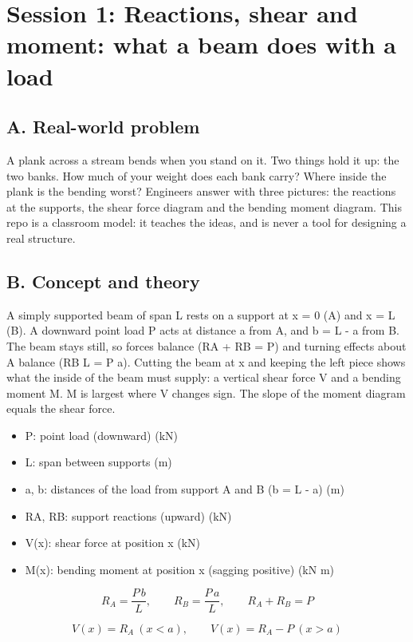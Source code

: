 \documentclass[11pt,a4paper]{article}
\begin{document}
\section{Session 1: Reactions, shear and moment: what a beam does with a load}

\subsection*{A. Real-world problem}
A plank across a stream bends when you stand on it. Two things hold it up: the two banks. How much of your weight does each bank carry? Where inside the plank is the bending worst? Engineers answer with three pictures: the reactions at the supports, the shear force diagram and the bending moment diagram. This repo is a classroom model: it teaches the ideas, and is never a tool for designing a real structure.

\subsection*{B. Concept and theory}
A simply supported beam of span L rests on a support at x = 0 (A) and x = L (B). A downward point load P acts at distance a from A, and b = L - a from B. The beam stays still, so forces balance (RA + RB = P) and turning effects about A balance (RB L = P a). Cutting the beam at x and keeping the left piece shows what the inside of the beam must supply: a vertical shear force V and a bending moment M. M is largest where V changes sign. The slope of the moment diagram equals the shear force.

\begin{itemize}[nosep]
\item P: point load (downward) (kN)
\item L: span between supports (m)
\item a, b: distances of the load from support A and B (b = L - a) (m)
\item RA, RB: support reactions (upward) (kN)
\item V(x): shear force at position x (kN)
\item M(x): bending moment at position x (sagging positive) (kN m)
\end{itemize}

\begin{equation*}
R_A=\frac{P\,b}{L},\qquad R_B=\frac{P\,a}{L},\qquad R_A+R_B=P
\end{equation*}

\begin{equation*}
V(x)=R_A\ (x<a),\qquad V(x)=R_A-P\ (x>a)
\end{equation*}
\end{document}
